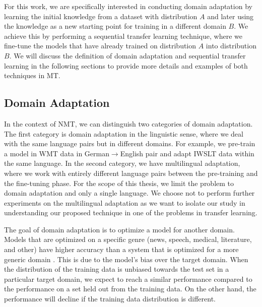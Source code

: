For this work, we are specifically interested in conducting domain adaptation by learning the initial knowledge from a dataset with distribution $A$ and later using the knowledge as a new starting point for training in a different domain $B$. We achieve this by performing a sequential transfer learning technique, where we fine-tune the models that have already trained on distribution $A$ into distribution $B$. We will discuss the definition of domain adaptation and sequential transfer learning in the following sections to provide more details and examples of both techniques in MT.

\subsection{Domain Adaptation}
\label{sec:domain_adapt}
In the context of NMT, we can distinguish two categories of domain adaptation. The first category is domain adaptation in the linguistic sense, where we deal with the same language pairs but in different domains. For example, we pre-train a model in WMT data in German$\rightarrow$English pair and adapt IWSLT data within the same language. In the second category, we have multilingual adaptation, where we work with entirely different language pairs between the pre-training and the fine-tuning phase. For the scope of this thesis, we limit the problem to domain adaptation and only a single language. We choose not to perform further experiments on the multilingual adaptation as we want to isolate our study in understanding our proposed technique in one of the problems in transfer learning.

The goal of domain adaptation is to optimize a model for another domain. Models that are optimized on a specific genre (news, speech, medical, literature, and other) have higher accuracy than a system that is optimized for a more generic domain . This is due to the model's bias over the target domain. When the distribution of the training data is unbiased towards the test set in a particular target domain, we expect to reach a similar performance compared to the performance on a set held out from the training data. On the other hand, the performance will decline if the training data distribution is different.

